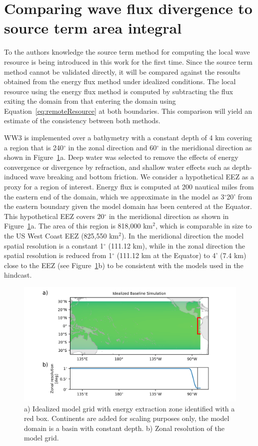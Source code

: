 \section{Comparing wave flux divergence to source term area integral}\label{appendix:flux-vs-area}

To the authors knowledge the source term method for computing the local wave resource is being introduced in this work for the first time. Since the source term method cannot be validated directly, it will be compared against the resoults obtained from the energy flux method under idealized conditions. The local resource using the energy flux method is computed by subtracting the flux exiting the domain from that entering the domain using Equation~\eqref{eq:remoteResource} at both boundaries. This comparison will yield an estimate of the consistency between both methods.

WW3 is implemented over a bathymetry with a constant depth of 4 km covering a region that is 240$^{\circ}$ in the zonal direction and 60$^{\circ}$ in the meridional direction as shown in Figure~\ref{fig:idealizedDomain}a. Deep water was selected to remove the effects of energy convergence or divergence by refraction, and shallow water effects such as depth-induced wave breaking and bottom friction. We consider a hypothetical EEZ as a proxy for a region of interest. Energy flux is computed at 200 nautical miles from the eastern end of the domain, which we approximate in the model as 3$^{\circ}$20’ from the eastern boundary given the model domain has been centered at the Equator. This hypothetical EEZ covers 20$^{\circ}$ in the meridional direction as shown in Figure~\ref{fig:idealizedDomain}a. The area of this region is 818,000 km$^{2}$, which is comparable in size to the US West Coast EEZ (825,550 km$^{2}$). In the meridional direction the model spatial resolution is a constant 1$^{\circ}$ (111.12 km), while in the zonal direction the spatial resolution is reduced from 1$^{\circ}$ (111.12 km at the Equator) to 4’ (7.4 km) close to the EEZ (see Figure~\ref{fig:idealizedDomain}b) to be consistent with the models used in the hindcast.
 
\begin{figure}[ht]
  \includegraphics[width=6in]{../diagram/appendixB_Figure1.png}
  \caption{a) Idealized model grid with energy extraction zone identified with a red box. Continents are added for scaling purposes only, the model domain is a basin with constant depth. b) Zonal resolution of the model grid.}
  \label{fig:idealizedDomain}
\end{figure}

